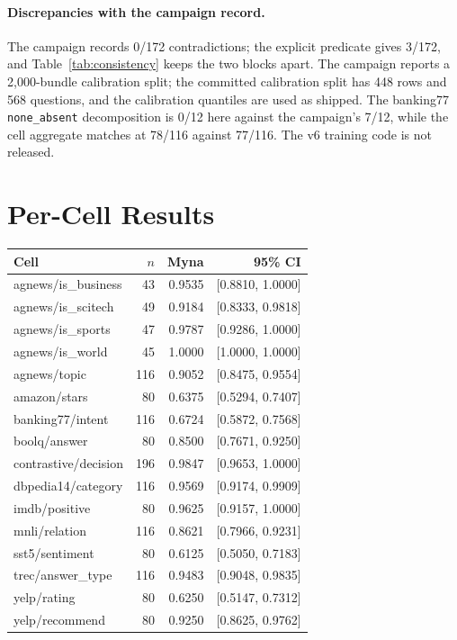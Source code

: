 \paragraph{Discrepancies with the campaign record.}
The campaign records 0/172 contradictions; the explicit predicate gives 3/172, and Table~\ref{tab:consistency} keeps the two blocks apart. The campaign reports a 2{,}000-bundle calibration split; the committed calibration split has 448 rows and 568 questions, and the calibration quantiles are used as shipped. The banking77 \texttt{none\_absent} decomposition is 0/12 here against the campaign's 7/12, while the cell aggregate matches at 78/116 against 77/116. The v6 training code is not released.

\section{Per-Cell Results}
\label{app:cells}

\begin{widetable}
\centering
\footnotesize
\caption{Per-cell local re-score with row-clustered 95\% intervals (20{,}000 replicates, seed 20261031). The interval is on the cell accuracy; the unit resampled is the row, not the question.}
\label{tab:cells}
\begin{tabular}{lrrr}
\toprule
Cell & $n$ & Myna & 95\% CI \\
\midrule
agnews/is\_business & 43 & 0.9535 & [0.8810, 1.0000] \\
agnews/is\_scitech & 49 & 0.9184 & [0.8333, 0.9818] \\
agnews/is\_sports & 47 & 0.9787 & [0.9286, 1.0000] \\
agnews/is\_world & 45 & 1.0000 & [1.0000, 1.0000] \\
agnews/topic & 116 & 0.9052 & [0.8475, 0.9554] \\
amazon/stars & 80 & 0.6375 & [0.5294, 0.7407] \\
banking77/intent & 116 & 0.6724 & [0.5872, 0.7568] \\
boolq/answer & 80 & 0.8500 & [0.7671, 0.9250] \\
contrastive/decision & 196 & 0.9847 & [0.9653, 1.0000] \\
dbpedia14/category & 116 & 0.9569 & [0.9174, 0.9909] \\
imdb/positive & 80 & 0.9625 & [0.9157, 1.0000] \\
mnli/relation & 116 & 0.8621 & [0.7966, 0.9231] \\
sst5/sentiment & 80 & 0.6125 & [0.5050, 0.7183] \\
trec/answer\_type & 116 & 0.9483 & [0.9048, 0.9835] \\
yelp/rating & 80 & 0.6250 & [0.5147, 0.7312] \\
yelp/recommend & 80 & 0.9250 & [0.8625, 0.9762] \\
\bottomrule
\end{tabular}
\end{widetable}

